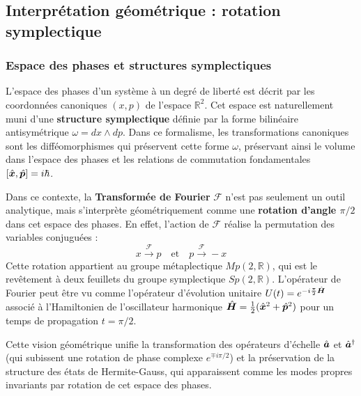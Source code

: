 

\subsection{Interprétation géométrique : rotation symplectique}




\subsubsection{Espace des phases et structures symplectiques}

L'espace des phases d'un système à un degré de liberté est décrit par les coordonnées canoniques $(x, p)$ de l'espace $\mathbb{R}^2$. Cet espace est naturellement muni d'une \textbf{structure symplectique} définie par la forme bilinéaire antisymétrique $\omega = dx \wedge dp$. Dans ce formalisme, les transformations canoniques sont les difféomorphismes qui préservent cette forme $\omega$, préservant ainsi le volume dans l'espace des phases et les relations de commutation fondamentales $[\hat{\bm{x}}, \hat{\bm{p}}] = i\hbar$.

Dans ce contexte, la \textbf{Transformée de Fourier} $\mathcal{F}$ n'est pas seulement un outil analytique, mais s'interprète géométriquement comme une \textbf{rotation d'angle $\pi/2$} dans cet espace des phases. En effet, l'action de $\mathcal{F}$ réalise la permutation des variables conjuguées :
\begin{equation}
    x \xrightarrow{\mathcal{F}} p \quad \text{et} \quad p \xrightarrow{\mathcal{F}} -x
\end{equation}
Cette rotation appartient au groupe métaplectique $Mp(2, \mathbb{R})$, qui est le revêtement à deux feuillets du groupe symplectique $Sp(2, \mathbb{R})$. L'opérateur de Fourier peut être vu comme l'opérateur d'évolution unitaire $U(t) = e^{-i \frac{\pi}{2} \hat{\bm{H}}}$ associé à l'Hamiltonien de l'oscillateur harmonique $\hat{\bm{H}} = \frac{1}{2}(\hat{\bm{x}}^2 + \hat{\bm{p}}^2)$ pour un temps de propagation $t = \pi/2$.



Cette vision géométrique unifie la transformation des opérateurs d'échelle $\hat{\bm{a}}$ et $\hat{\bm{a}}^\dagger$ (qui subissent une rotation de phase complexe $e^{\mp i\pi/2}$) et la préservation de la structure des états de Hermite-Gauss, qui apparaissent comme les modes propres invariants par rotation de cet espace des phases.

